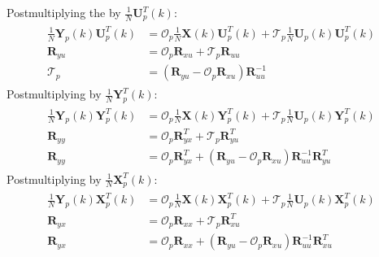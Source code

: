 \documentclass[letterpaper,10pt,english]{sphinxmanual}
\begin{document}
\sphinxAtStartPar
Post\sphinxhyphen{}multiplying the {\hyperref[\detokenize{theory/srim:discrete-time-system-matrix-equation}]{}} by
\(\frac{1}{N}\mathbf{U}_{p}^{T}(k)\):
\begin{equation*}
\begin{split}\begin{aligned}
\frac{1}{N}\mathbf{Y}_{p}(k)\mathbf{U}_{p}^{T}(k) &= \mathcal{O}_{p}\frac{1}{N}\mathbf{X}(k)\mathbf{U}_{p}^{T}(k) + \mathcal{T}_{p}\frac{1}{N}\mathbf{U}_{p}(k)\mathbf{U}_{p}^{T}(k)
\\
\mathbf{R}_{yu} &= \mathcal{O}_{p}\mathbf{R}_{xu} + \mathcal{T}_{p}\mathbf{R}_{uu}
\\
\mathcal{T}_{p} &= \left( \mathbf{R}_{yu} - \mathcal{O}_{p}\mathbf{R}_{xu} \right)\mathbf{R}_{uu}^{-1}
\end{aligned}\end{split}
\end{equation*}
\sphinxAtStartPar
Post\sphinxhyphen{}multiplying by \(\frac{1}{N}\mathbf{Y}_{p}^{T}(k)\):
\begin{equation*}
\begin{split}\begin{aligned}
\frac{1}{N}\mathbf{Y}_{p}(k)\mathbf{Y}_{p}^{T}(k) &= \mathcal{O}_{p}\frac{1}{N}\mathbf{X}(k)\mathbf{Y}_{p}^{T}(k) + \mathcal{T}_{p}\frac{1}{N}\mathbf{U}_{p}(k)\mathbf{Y}_{p}^{T}(k)
\\
\mathbf{R}_{yy} &= \mathcal{O}_{p}\mathbf{R}_{yx}^{T} + \mathcal{T}_{p}\mathbf{R}_{yu}^{T}
\\
\mathbf{R}_{yy} &= \mathcal{O}_{p}\mathbf{R}_{yx}^{T} + \left( \mathbf{R}_{yu} - \mathcal{O}_{p}\mathbf{R}_{xu} \right)\mathbf{R}_{uu}^{-1}\mathbf{R}_{yu}^{T}
\end{aligned}\end{split}
\end{equation*}
\sphinxAtStartPar
Post\sphinxhyphen{}multiplying by \(\frac{1}{N}\mathbf{X}_{p}^{T}(k)\):
\begin{equation*}
\begin{split}\begin{aligned}
\frac{1}{N}\mathbf{Y}_{p}(k)\mathbf{X}_{p}^{T}(k) &= \mathcal{O}_{p}\frac{1}{N}\mathbf{X}(k)\mathbf{X}_{p}^{T}(k) + \mathcal{T}_{p}\frac{1}{N}\mathbf{U}_{p}(k)\mathbf{X}_{p}^{T}(k)
\\
\mathbf{R}_{yx} &= \mathcal{O}_{p}\mathbf{R}_{xx} + \mathcal{T}_{p}\mathbf{R}_{xu}^{T}
\\
\mathbf{R}_{yx} &= \mathcal{O}_{p}\mathbf{R}_{xx} + \left( \mathbf{R}_{yu} - \mathcal{O}_{p}\mathbf{R}_{xu} \right)\mathbf{R}_{uu}^{-1}\mathbf{R}_{xu}^{T}
\end{aligned}\end{split}
\end{equation*}
\end{document}

